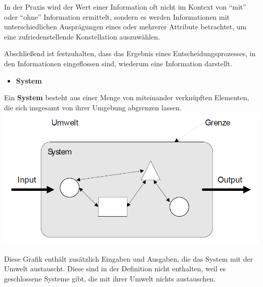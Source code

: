 \documentclass[]{article}
\providecommand{\tightlist}{%
  \setlength{\itemsep}{0pt}\setlength{\parskip}{0pt}}
\begin{document}
In der Praxis wird der Wert einer Information oft nicht im Kontext von
``mit'' oder ``ohne'' Information ermittelt, sondern es werden
Informationen mit unterschiedlichen Ausprägungen eines oder mehrerer
Attribute betrachtet, um eine zufriedenstellende Konstellation
auszuwählen.

Abschließend ist festzuhalten, dass das Ergebnis eines
Entscheidungsprozesses, in den Informationen eingeflossen sind, wiederum
eine Information darstellt.

\begin{itemize}
\tightlist
\item
  \textbf{System}
\end{itemize}

Ein \textbf{System} besteht aus einer Menge von miteinander verknüpften
Elementen, die sich insgesamt von ihrer Umgebung abgrenzen lassen.
\includegraphics{img/systemdefi.png}

Diese Grafik enthält zusätzlich Eingaben und Ausgaben, die das System
mit der Umwelt austauscht. Diese sind in der Definition nicht enthalten,
weil es geschlossene Systeme gibt, die mit ihrer Umwelt nichts
austauschen.
\end{document}
